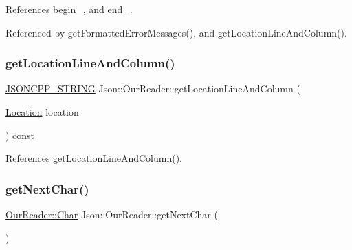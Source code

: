 References begin\+\_\+, and end\+\_\+.



Referenced by get\+Formatted\+Error\+Messages(), and get\+Location\+Line\+And\+Column().

\mbox{\label{classJson_1_1OurReader_ac129e94cdc260822b2fd24e2ca35e636_ac129e94cdc260822b2fd24e2ca35e636}} 
\subsubsection{\texorpdfstring{get\+Location\+Line\+And\+Column()}{getLocationLineAndColumn()}\hspace{0.1cm}{\footnotesize\ttfamily [2/2]}}
{\footnotesize\ttfamily \hyperlink{json_8h_a1e723f95759de062585bc4a8fd3fa4be_a1e723f95759de062585bc4a8fd3fa4be}{J\+S\+O\+N\+C\+P\+P\+\_\+\+S\+T\+R\+I\+NG} Json\+::\+Our\+Reader\+::get\+Location\+Line\+And\+Column (\begin{DoxyParamCaption}\item[{\hyperlink{classJson_1_1OurReader_a1bdc7bbc52ba87cae6b19746f2ee0189_a1bdc7bbc52ba87cae6b19746f2ee0189}{Location}}]{location }\end{DoxyParamCaption}) const\hspace{0.3cm}{\ttfamily [private]}}



References get\+Location\+Line\+And\+Column().

\mbox{\label{classJson_1_1OurReader_a298285d035fdbc554caae09d9f0a5859_a298285d035fdbc554caae09d9f0a5859}} 
\subsubsection{\texorpdfstring{get\+Next\+Char()}{getNextChar()}}
{\footnotesize\ttfamily \hyperlink{classJson_1_1OurReader_a0cd0bab4caa66594ab843ccd5f9dc239_a0cd0bab4caa66594ab843ccd5f9dc239}{Our\+Reader\+::\+Char} Json\+::\+Our\+Reader\+::get\+Next\+Char (\begin{DoxyParamCaption}{ }\end{DoxyParamCaption})\hspace{0.3cm}{\ttfamily [private]}}



